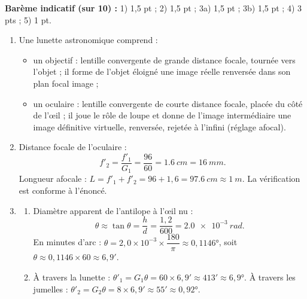\documentclass[11pt]{article}
\newcommand{\cle}[1]{{\popxbold\color{popdark}#1}}
\begin{document}
\begin{corrige}
\textbf{Barème indicatif (sur 10) :} 1) 1,5 pt ; 2) 1,5 pt ; 3a) 1,5 pt ; 3b) 1,5 pt ; 4) 3 pts ; 5) 1 pt.
\begin{enumerate}
\item Une lunette astronomique comprend :
\begin{itemize}
\item un \cle{objectif} : lentille convergente de grande distance focale, tournée vers l'objet ; il forme de l'objet éloigné une image réelle renversée dans son plan focal image ;
\item un \cle{oculaire} : lentille convergente de courte distance focale, placée du côté de l'œil ; il joue le rôle de loupe et donne de l'image intermédiaire une image définitive virtuelle, renversée, rejetée à l'infini (réglage afocal).
\end{itemize}
\item Distance focale de l'oculaire :
\[ f'_2 = \dfrac{f'_1}{G_1} = \dfrac{96}{60} = \SI{1,6}{cm} = \SI{16}{mm}. \]
Longueur afocale : $L = f'_1 + f'_2 = 96 + 1{,}6 = \SI{97,6}{cm} \approx \SI{1}{m}$. La vérification est conforme à l'énoncé.
\item 
\begin{enumerate}
\item[a)] Diamètre apparent de l'antilope à l'œil nu :
\[ \theta \approx \tan\theta = \dfrac{h}{d} = \dfrac{1{,}2}{600} = \SI{2,0e-3}{rad}. \]
En minutes d'arc : $\theta = 2{,}0\times10^{-3} \times \dfrac{180}{\pi} \approx 0{,}1146°$, soit $\theta \approx 0{,}1146 \times 60 \approx 6{,}9'$.
\item[b)] À travers la lunette : $\theta'_1 = G_1\theta = 60 \times 6{,}9' \approx 413' \approx 6{,}9°$. À travers les jumelles : $\theta'_2 = G_2\theta = 8 \times 6{,}9' \approx 55' \approx 0{,}92°$.
\end{enumerate}

\end{enumerate}
\end{corrige}
\end{document}
